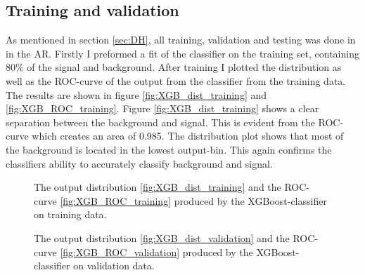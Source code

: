 \documentclass{article}
\begin{document}
\subsection{Training and validation}\label{subsec:training}
As mentioned in section \ref{sec:DH}, all training, validation and testing was done in in the AR. Firstly I preformed a fit of the classifier on the training set, containing $80\%$ of the signal and background. After training I plotted the distribution as well as the ROC-curve of the output from the classifier from the training data. The results are shown in figure \ref{fig:XGB_dist_training} and \ref{fig:XGB_ROC_training}. Figure \ref{fig:XGB_dist_training} shows a clear separation between the background and signal.  This is evident from the ROC-curve which creates an area of 0.985. The distribution plot shows that most of the background is located in the lowest output-bin. This again confirms the classifiers ability to accurately classify background and signal.  
\begin{figure}
    \caption{The output distribution \ref{fig:XGB_dist_training} and the ROC-curve \ref{fig:XGB_ROC_training} produced by the XGBoost-classifier on training data. }
\end{figure}
\begin{figure}
    \caption{The output distribution \ref{fig:XGB_dist_validation} and the ROC-curve \ref{fig:XGB_ROC_validation} produced by the XGBoost-classifier on validation data.}
\end{figure}
\end{document}
